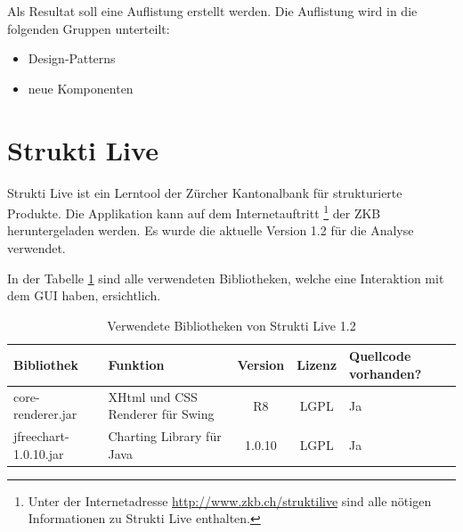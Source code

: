   Als Resultat soll eine Auflistung erstellt werden. Die Auflistung wird in die
  folgenden Gruppen unterteilt:
  
  \begin{itemize}
    \item Design-Patterns
    \item neue Komponenten
  \end{itemize}
  
  \section{Strukti Live}
  
  Strukti Live ist ein Lerntool der Zürcher Kantonalbank für strukturierte
  Produkte. Die Applikation kann auf dem Internetauftritt \footnote{Unter der
  Internetadresse \url{http://www.zkb.ch/struktilive} sind alle nötigen
  Informationen zu Strukti Live enthalten.} der \ac{ZKB} heruntergeladen
  werden. Es wurde die aktuelle Version 1.2 für die Analyse verwendet.
  
  In der Tabelle \ref{tab:bibliothekenStruktiLive} sind alle verwendeten
  Bibliotheken, welche eine Interaktion mit dem \ac{GUI} haben, ersichtlich.
  \newline
  
  \begin{table}[ht]
    \sffamily 
    \begin{center}
      \begin{tabular}{lp{4.5cm}ccp{2cm}}
        \toprule
        Bibliothek & Funktion & Version & Lizenz & Quellcode vorhanden?\\
        \midrule
        core-renderer.jar & XHtml und CSS Renderer für Swing & R8 & LGPL & Ja\\
        jfreechart-1.0.10.jar & Charting Library für Java & 1.0.10 & LGPL & Ja\\
        \bottomrule
      \end{tabular}
      \caption{Verwendete Bibliotheken von Strukti Live 1.2}
      \label{tab:bibliothekenStruktiLive}
    \end{center}
  \end{table}
  
